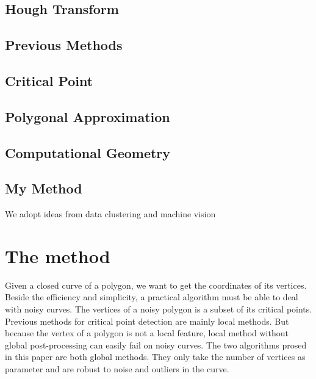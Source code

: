 \documentclass{article}
\begin{document}
\subsection{Hough Transform}
\label{sub:Hough Transform}

\subsection{Previous Methods}
\label{sub:Previous Methods}

\subsection{Critical Point}
\label{sub:Critical Point}

\subsection{Polygonal Approximation}
\label{sub:polygon}

\subsection{Computational Geometry}
\label{sub:Computational Geometry}

\subsection{My Method}
\label{sub:My Method}

We adopt ideas from data clustering and machine vision

\section{The method}
\label{sec:The method}

Given a closed curve of a polygon, we want to get the coordinates of its vertices.
Beside the efficiency and simplicity, a practical algorithm must be able
to deal with noisy curves. The vertices of a noisy polygon is a subset of its critical points.
Previous methods for critical point detection are mainly local methods. But because the vertex of a
polygon is not a local feature, local method without global post-processing can easily fail on noisy curves.
The two algorithms prosed in this paper are both global methods. They only take the number of vertices
as parameter and are robust to noise and outliers in the curve.
\end{document}
